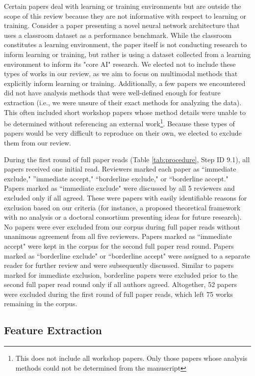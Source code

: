 \documentclass[manuscript,screen,review]{acmart}
\begin{document}
Certain papers deal with learning or training environments but are outside the scope of this review because they are not informative with respect to learning or training. Consider a paper presenting a novel neural network architecture that uses a classroom dataset as a performance benchmark. While the classroom constitutes a learning environment, the paper itself is not conducting research to inform learning or training, but rather is using a dataset collected from a learning environment to inform its "core AI" research. We elected not to include these types of works in our review, as we aim to focus on multimodal methods that explicitly inform learning or training. Additionally, a few papers we encountered did not have analysis methods that were well-defined enough for feature extraction (i.e., we were unsure of their exact methods for analyzing the data). This often included short workshop papers whose method details were unable to be determined without referencing an external work\footnote{This does not include all workshop papers. Only those papers whose analysis methods could not be determined from the manuscript}. Because these types of papers would be very difficult to reproduce on their own, we elected to exclude them from our review.

During the first round of full paper reads (Table \ref{tab:procedure}, Step ID 9.1), all papers received one initial read. Reviewers marked each paper as ``immediate exclude," ''immediate accept," ``borderline exclude," or ``borderline accept." Papers marked as ``immediate exclude" were discussed by all 5 reviewers and excluded only if all agreed. These were papers with easily identifiable reasons for exclusion based on our criteria (for instance, a proposed theoretical framework with no analysis or a doctoral consortium presenting ideas for future research). No papers were ever excluded from our corpus during full paper reads without unanimous agreement from all five reviewers. Papers marked as ``immediate accept" were kept in the corpus for the second full paper read round. Papers marked as ``borderline exclude" or ``borderline accept" were assigned to a separate reader for further review and were subsequently discussed. Similar to papers marked for immediate exclusion, borderline papers were excluded prior to the second full paper read round only if all authors agreed. Altogether, 52 papers were excluded during the first round of full paper reads, which left 75 works remaining in the corpus. 

\subsection{Feature Extraction}
\end{document}
